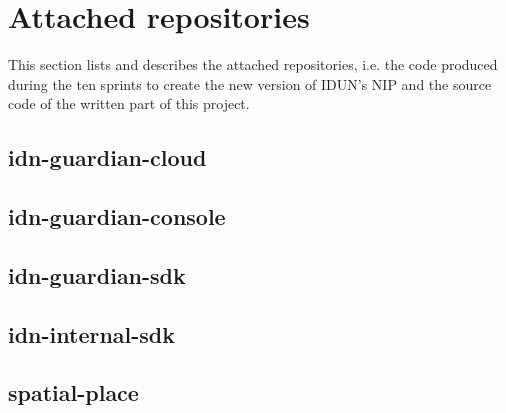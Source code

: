 \chapter{Attached repositories}
\label{appendix6-attached-repositories}

This section lists and describes the attached repositories, i.e. the code produced during the ten sprints to create the new version of IDUN's NIP and the source code of the written part of this project.

\section*{idn-guardian-cloud}

\section*{idn-guardian-console}

\section*{idn-guardian-sdk}

\section*{idn-internal-sdk}

\section*{spatial-place}
